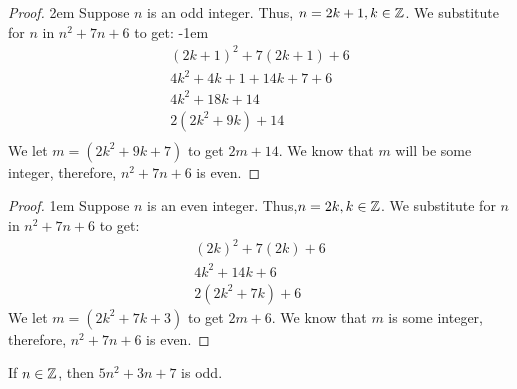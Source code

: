 \begin{mdframed}[backgroundcolor=gray!10!]
\begin{mdframed}[backgroundcolor=white]
\begin{proof} \openup 2em 
Suppose $n$ is an odd integer.  Thus, $n=2k+1,k\in\mathbb{Z}$.  We substitute for $n$ in $n^2+7n+6$ to get:
\openup -1em
	\begin{align*}
	(2k+1)^2+7(2k+1)+6\\
	4k^2+4k+1+14k+7+6\\
	4k^2+18k+14\\
	2(2k^2+9k)+14\\
	\end{align*}
We let $m=(2k^2+9k+7)$ to get $2m+14$.  We know that $m$ will be some integer, therefore, $n^2+7n+6$ is even.
\end{proof}
\end{mdframed}

\begin{mdframed}[backgroundcolor=white]
\begin{proof} \openup 1em
Suppose $n$ is an even integer.  Thus,$n=2k,k\in\mathbb{Z}$.  We substitute for $n$ in $n^2+7n+6$ to get:
	\begin{align*}
	(2k)^2+7(2k)+6\\
	4k^2+14k+6\\
	2(2k^2+7k)+6
	\end{align*}
We let $m=(2k^2+7k+3)$ to get $2m+6$.  We know that $m$ is some integer, therefore, $n^2+7n+6$ is even.
\end{proof}
\end{mdframed}
\end{mdframed}

\begin{claim}
If $n \in \mathbb{Z}$, then $5n^2+3n+7$ is odd.
\end{claim}

